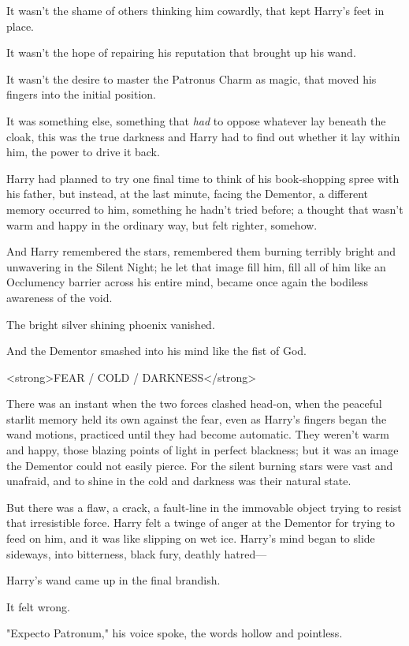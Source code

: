 It wasn't the shame of others thinking him cowardly, that kept Harry's feet in 
place.

It wasn't the hope of repairing his reputation that brought up his wand.

It wasn't the desire to master the Patronus Charm as magic, that moved his 
fingers into the initial position.

It was something else, something that \emph{had} to oppose whatever lay beneath 
the cloak, this was the true darkness and Harry had to find out whether it lay 
within him, the power to drive it back.

Harry had planned to try one final time to think of his book-shopping spree 
with his father, but instead, at the last minute, facing the Dementor, a 
different memory occurred to him, something he hadn't tried before; a thought 
that wasn't warm and happy in the ordinary way, but felt righter, somehow.

And Harry remembered the stars, remembered them burning terribly bright and 
unwavering in the Silent Night; he let that image fill him, fill all of him 
like an Occlumency barrier across his entire mind, became once again the 
bodiless awareness of the void.

The bright silver shining phoenix vanished.

And the Dementor smashed into his mind like the fist of God.

<strong>FEAR / COLD / DARKNESS</strong>

There was an instant when the two forces clashed head-on, when the peaceful 
starlit memory held its own against the fear, even as Harry's fingers began the 
wand motions, practiced until they had become automatic. They weren't warm and 
happy, those blazing points of light in perfect blackness; but it was an image 
the Dementor could not easily pierce. For the silent burning stars were vast 
and unafraid, and to shine in the cold and darkness was their natural state.

But there was a flaw, a crack, a fault-line in the immovable object trying to 
resist that irresistible force. Harry felt a twinge of anger at the Dementor 
for trying to feed on him, and it was like slipping on wet ice. Harry's mind 
began to slide sideways, into bitterness, black fury, deathly hatred---

Harry's wand came up in the final brandish.

It felt wrong.

"Expecto Patronum," his voice spoke, the words hollow and pointless.

